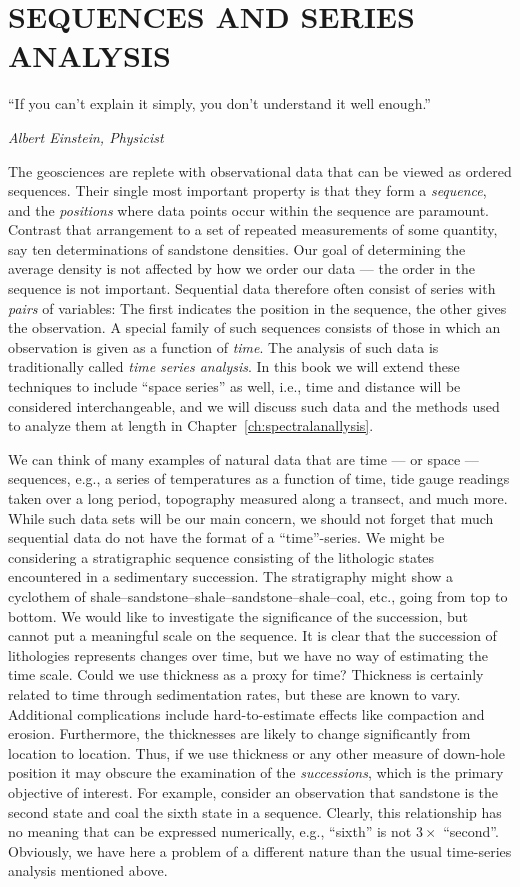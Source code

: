 %
\chapter{SEQUENCES AND SERIES ANALYSIS}
\label{ch:sequences}
\epigraph{``If you can't explain it simply, you don't understand it well enough.''}{\textit{Albert Einstein, Physicist}}
	The geosciences are replete with observational data that can be viewed as ordered sequences.  
Their single most important property is that they form a \emph{sequence}, and the \emph{positions} where 
data points occur within the sequence are paramount.  Contrast that arrangement to a set of repeated 
measurements of some quantity, say ten determinations of sandstone densities.  Our goal of 
determining the average density is not affected by how we order our data --- the order in the 
sequence is not important.  Sequential data therefore often consist of series with \emph{pairs} of 
variables:  The first indicates the position in the sequence, the other gives the observation.  A 
special family of such sequences consists of those in which an observation is given as a function of \emph{time}.  
The analysis of such data is traditionally called \emph{time series analysis}.  In this book we will 
extend these techniques to include ``space series'' as well, i.e., time and distance will be 
considered interchangeable, and we will discuss such data and the methods used to analyze them at
length in Chapter~\ref{ch:spectralanallysis}.
 
      We can think of many examples of natural data that are time --- or space ---
sequences, e.g., a series of temperatures as a function of time, tide gauge readings taken over  a 
long period, topography measured along a transect, and much more.  While such data sets will be our 
main concern, we should not forget that much sequential data do not have the format 
of a ``time''-series.  We might be considering a stratigraphic sequence consisting of the lithologic 
states encountered in a sedimentary succession.  The stratigraphy might show a cyclothem of 
shale--sandstone--shale--sandstone--shale--coal, etc., going from top to bottom.  We would like to 
investigate the significance of the succession, but cannot put a meaningful scale on the sequence.  
It is clear that the succession of lithologies represents changes over time, but we have no way of 
estimating the time scale.  Could we use thickness as a proxy for time?  Thickness is certainly related 
to time through sedimentation rates, but these are known to vary.  Additional complications include 
hard-to-estimate effects like compaction and erosion.  Furthermore, the thicknesses are likely to change 
significantly from location to location.  Thus, if we use thickness or any other measure of down-hole
position it may obscure the examination of the \emph{successions}, which is the primary objective of interest. 
For example, consider an observation that sandstone is the second state and coal the sixth state
in a sequence.  Clearly, this relationship has no meaning that can be 
expressed numerically, e.g., ``sixth'' is not $3 \times$ ``second''.  Obviously, we have here a problem of a 
different nature than the usual time-series analysis mentioned above.  

